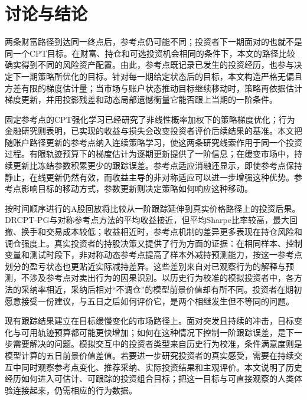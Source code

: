 \chapter{讨论与结论}\label{sec:discussion}

两条财富路径到达同一终点后，参考点仍可能不同；投资者下一期面对的也就不是同一个CPT目标。在财富、持仓和可选投资机会相同的条件下，本文的路径比较确实得到不同的风险资产配置。由此，参考点既记录已发生的投资经历，也参与决定下一期策略所优化的目标。针对每一期给定状态后的目标，本文构造严格无偏且方差有限的梯度估计量；当市场与账户状态推动目标继续移动时，策略再依据估计梯度更新，并用投影残差和动态局部遗憾衡量它能否跟上当期的一阶条件。

固定参考点的CPT强化学习已经研究了非线性概率加权下的策略梯度优化\citep{prashanth2016cumulative,lepel2026policygradients}；行为金融研究则表明，已实现的收益与损失会改变投资者评价后续结果的基准\citep{arkes2008reference,he2019realization,qin2022realization,gao2024multiperiod}。本文把随账户路径更新的参考点纳入连续策略学习，使这两条研究线索作用于同一个投资过程。有限轨迹预算下的梯度估计为逐期更新提供了一阶信息；在缓变市场中，持续更新比冻结参数积累更少的跟踪误差。参考点适应消融还显示，即使参考点保持静止，在线更新仍然有效，而收益主导的非对称适应可以进一步增强这种优势。参考点影响目标的移动方式，参数更新则决定策略如何响应这种移动。

按时间顺序进行的A股回放将比较从一阶跟踪延伸到真实价格路径上的投资后果。DRCPT-PG与对称参考点方法的平均收益接近，但平均Sharpe比率较高，最大回撤、换手和交易成本较低；收益相近时，参考点机制的差异更多表现在持仓风险和调仓强度上。真实投资者的持股决策又提供了行为方面的证据：在相同样本、控制变量和测试时段下，非对称动态参考点提高了样本外减持预测能力，按这一参考点划分的盈亏状态也更贴近实际减持差异。这些差别来自对已观察行为的解释与预测，不涉及参考点对卖出行为的因果识别。以历史行为校准的模拟投资者中，各方法的采纳率相近，采纳后相对“不调仓”的模型前景价值却有所不同。投资者在期初愿意接受一份建议，与五日之后如何评价它，是两个相继发生但不等同的问题。

现有跟踪结果建立在目标缓慢变化的市场路径上。面对突发且持续的冲击，目标变化与可用轨迹预算都可能更快增加；如何在这种情况下控制一阶跟踪误差，是下一步需要解决的问题。模拟交互中的投资者类型来自历史行为校准，条件满意度则是模型计算的五日前景价值差值。若要进一步研究投资者的真实感受，需要在持续交互中同时观察参考点变化、推荐采纳、实际投资结果和主观评价。本文说明了历史经历如何进入可估计、可跟踪的投资组合目标；把这一目标与可直接观察的人类体验连接起来，仍需相应的行为数据。
